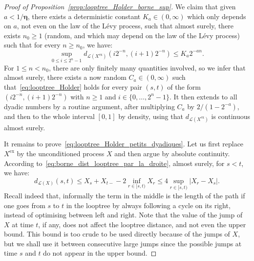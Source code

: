 \documentclass[british, a4paper,11pt]{article}
\numberwithin{equation}{section}
\theoremstyle{definition}
\newcommand{\Loop}{\mathscr{L}}
\newcommand{\bdeta}{\boldsymbol{\eta}}
\newcommand{\exc}{\mathrm{ex}}
\begin{document}
\begin{proof}[Proof of Proposition~\ref{prop:looptree_Holder_borne_sup}]
We claim that given $a < 1/\bdeta$, there exists a deterministic constant $K_a \in (0,\infty)$ which only depends on $a$, not even on the law of the L\'evy process, such that almost surely, there exists $n_0 \geq 1$ (random, and which may depend on the law of the L\'evy process) such that for every $n \geq n_0$, we have:
\begin{equation}\label{eq:looptree_Holder_petits_dyadiques}
\sup_{0 \leq i \leq 2^{n}-1} d_{\Loop(X^{\exc})}(i 2^{-n}, (i+1) 2^{-n}) \leq K_a 2^{-an}.
\end{equation}
For $1 \le n < n_0$, there are only finitely many quantities involved, so we infer that almost surely, there exists a now random $C_a \in (0,\infty)$ such that~\eqref{eq:looptree_Holder} holds for every pair $(s,t)$ of the form $(i 2^{-n}, (i+1)2^{-n})$ with $n \geq 1$ and $i \in \{0, \dots, 2^{n}-1\}$. It then extends to all dyadic numbers by a routine argument, after multiplying $C_a$ by $2/(1-2^{-a})$, and then to the whole interval $[0,1]$ by density, using that $d_{\Loop(X^{\exc})}$ is continuous almost surely.

It remains to prove~\eqref{eq:looptree_Holder_petits_dyadiques}. 
Let us first replace $X^{\exc}$ by the unconditioned process $X$ and then argue by absolute continuity. 
According to~\eqref{eq:borne_dist_looptree_par_la_droite}, almost surely, for $s<t$, we have:
\[d_{\Loop(X)}(s,t) 
\leq X_{s} + X_{t-} - 2 \inf_{r \in [s,t)} X_{r} 
\leq 4 \sup_{r \in [s,t)} |X_{r}-X_{s}|.\]
Recall indeed that, informally the term in the middle is the length of the path if one goes from $s$ to $t$ in the looptree by always following a cycle on its right, instead of optimising between left and right.
Note that the value of the jump of $X$ at time $t$, if any, does not affect the looptree distance, and not even the upper bound. 
This bound is too crude to be used directly because of the jumps of $X$, but we shall use it between consecutive large jumps since the possible jumps at time $s$ and $t$ do not appear in the upper bound.



\end{proof}
\end{document}
